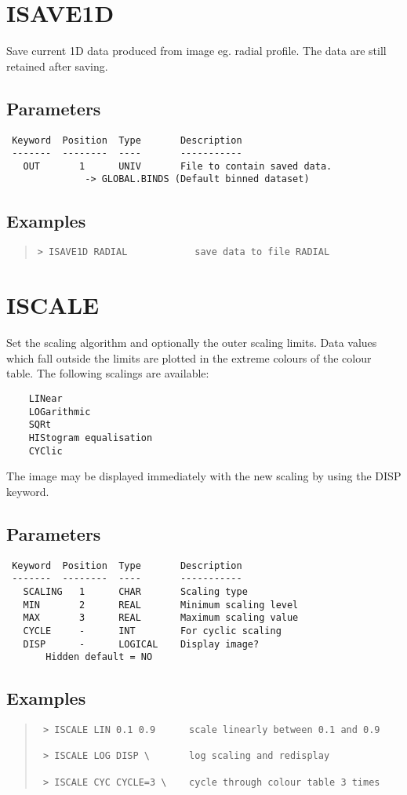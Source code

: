 \documentclass{book}
\renewcommand{\_}{{\tt\char'137}}     %
\begin{document}
\section{ISAVE1D}
Save current 1D data produced from image eg. radial profile.
The data are still retained after saving.

\subsection{Parameters}
\begin{verbatim}
 Keyword  Position  Type       Description
 -------  --------  ----       -----------
   OUT       1      UNIV       File to contain saved data.
              -> GLOBAL.BINDS (Default binned dataset)

\end{verbatim}\subsection{Examples}
\begin{quote}\begin{verbatim}
> ISAVE1D RADIAL            save data to file RADIAL
\end{verbatim}\end{quote}
\section{ISCALE}
Set the scaling algorithm and optionally the outer scaling limits.
Data values which fall outside the limits are plotted in the extreme
colours of the colour table. The following scalings are available:

\begin{verbatim}
    LINear
    LOGarithmic
    SQRt
    HIStogram equalisation
    CYClic
 \end{verbatim}
The image may be displayed immediately with the new scaling by using
the DISP keyword.

\subsection{Parameters}
\begin{verbatim}
 Keyword  Position  Type       Description
 -------  --------  ----       -----------
   SCALING   1      CHAR       Scaling type
   MIN       2      REAL       Minimum scaling level
   MAX       3      REAL       Maximum scaling value
   CYCLE     -      INT        For cyclic scaling
   DISP      -      LOGICAL    Display image?
       Hidden default = NO
\end{verbatim}\subsection{Examples}
\begin{quote}\begin{verbatim}
 > ISCALE LIN 0.1 0.9      scale linearly between 0.1 and 0.9

 > ISCALE LOG DISP \       log scaling and redisplay

 > ISCALE CYC CYCLE=3 \    cycle through colour table 3 times
 \end{verbatim}\end{quote}
\end{document}
